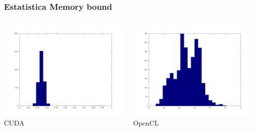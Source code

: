 \documentclass[brazil]{beamer}
\begin{document}
\begin{frame}[fragile]
  \frametitle{Estatistica Memory bound}
  \begin{columns}
    \begin{column}{.5\textwidth}
          \includegraphics[scale=0.15]{resultados_cuda_memory_histo.jpg} \\
          CUDA
    \end{column}
    \begin{column}{.5\textwidth}
          \includegraphics[scale=0.15]{resultados_opencl_memory_histo.jpg} \\
          OpenCL
    \end{column}
  \end{columns}
\end{frame}
\end{document}
